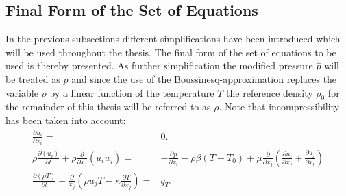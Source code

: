 \subsection{Final Form of the Set of Equations}

In the previous subsections different simplifications have been introduced which will be used throughout the thesis. The final form of the set of equations to be used is thereby presented. As further simplification the modified pressure \(\hat{p}\) will be treated as \(p\) and since the use of the Boussinesq-approximation replaces the variable \(\rho\) by a linear function of the temperature \(T\) the reference density \(\rho_0\) for the remainder of this thesis will be referred to as \(\rho\). Note that incompressibility has been taken into account:
\begin{subequations}
\label{eq:completeset}
\begin{align}
\label{eq:contidiff}
\frac{\partial u_i}{\partial x_i} =& 0. \\[1em]
\label{eq:momentumdiff}
\rho \frac{\partial \left( u_i \right)}{\partial t} 
+ \rho \frac{\partial}{\partial x_j} \left( u_i  u_j \right) 
=& - \frac{\partial p}{\partial x_i} 
- \rho \beta \left( T - T_0 \right)
+  \mu \frac{\partial}{\partial x_j} \left( \frac{\partial u_i}{\partial x_j} 
+ \frac{\partial u_j}{\partial x_i} \right) \\[1em]
\label{eq:temperaturediff}
\frac{\partial \left(\rho T \right)}{\partial t} + \frac{\partial}{x_j} \left( \rho u_j T - \kappa \frac{\partial T}{\partial x_j} \right) =& q_T.
\end{align}
\end{subequations}
